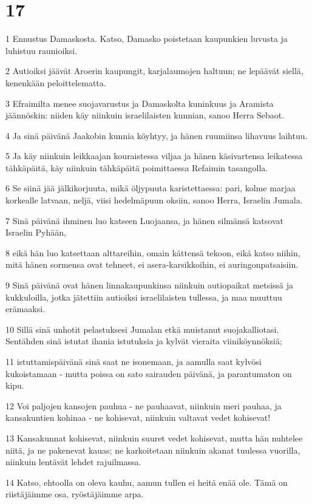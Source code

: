 \chapter{17}

\par 1 Ennustus Damaskosta. Katso, Damasko poistetaan kaupunkien luvusta ja luhistuu raunioiksi.
\par 2 Autioiksi jäävät Aroerin kaupungit, karjalaumojen haltuun; ne lepäävät siellä, kenenkään peloittelematta.
\par 3 Efraimilta menee suojavarustus ja Damaskolta kuninkuus ja Aramista jäännöskin: niiden käy niinkuin israelilaisten kunnian, sanoo Herra Sebaot.
\par 4 Ja sinä päivänä Jaakobin kunnia köyhtyy, ja hänen ruumiinsa lihavuus laihtuu.
\par 5 Ja käy niinkuin leikkaajan kouraistessa viljaa ja hänen käsivartensa leikatessa tähkäpäitä, käy niinkuin tähkäpäitä poimittaessa Refaimin tasangolla.
\par 6 Se siinä jää jälkikorjuuta, mikä öljypuuta karistettaessa: pari, kolme marjaa korkealle latvaan, neljä, viisi hedelmäpuun oksiin, sanoo Herra, Israelin Jumala.
\par 7 Sinä päivänä ihminen luo katseen Luojaansa, ja hänen silmänsä katsovat Israelin Pyhään,
\par 8 eikä hän luo katsettaan alttareihin, omain kättensä tekoon, eikä katso niihin, mitä hänen sormensa ovat tehneet, ei asera-karsikkoihin, ei auringonpatsaisiin.
\par 9 Sinä päivänä ovat hänen linnakaupunkinsa niinkuin autiopaikat metsissä ja kukkuloilla, jotka jätettiin autioiksi israelilaisten tullessa, ja maa muuttuu erämaaksi.
\par 10 Sillä sinä unhotit pelastuksesi Jumalan etkä muistanut suojakalliotasi. Sentähden sinä istutat ihania istutuksia ja kylvät vieraita viiniköynnöksiä;
\par 11 istuttamispäivänä sinä saat ne isonemaan, ja aamulla saat kylvösi kukoistamaan - mutta poissa on sato sairauden päivänä, ja parantumaton on kipu.
\par 12 Voi paljojen kansojen pauhua - ne pauhaavat, niinkuin meri pauhaa, ja kansakuntien kohinaa - ne kohisevat, niinkuin valtavat vedet kohisevat!
\par 13 Kansakunnat kohisevat, niinkuin suuret vedet kohisevat, mutta hän nuhtelee niitä, ja ne pakenevat kauas; ne karkoitetaan niinkuin akanat tuulessa vuorilla, niinkuin lentävät lehdet rajuilmassa.
\par 14 Katso, ehtoolla on oleva kauhu, aamun tullen ei heitä enää ole. Tämä on riistäjäimme osa, ryöstäjäimme arpa.

